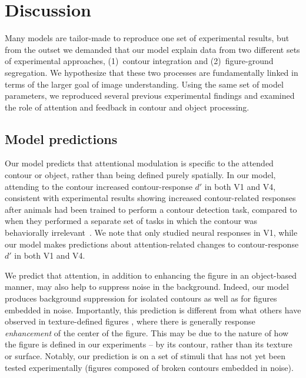 {\section{Discussion}
\label{sec:discussion}
%
Many models are tailor-made to reproduce one set of experimental results,
but from the outset we demanded
that our model explain data from two
different sets of experimental approaches, (1)~contour integration and
(2)~figure-ground segregation. 
We hypothesize that these two processes are 
 fundamentally linked in terms of the larger goal of image understanding.
Using the same set of model parameters, we reproduced several previous
experimental findings and examined the role of attention and feedback
in contour and object processing. 

\subsection{Model predictions}
Our model predicts that attentional modulation is specific to the
attended contour or object, 
rather than being defined purely
spatially. In our model, attending to the contour increased
contour-response $d'$ in both V1 and V4, consistent with experimental
results showing increased contour-related responses after animals had
been trained to perform a contour detection task, compared to when
they performed a separate set of tasks in which the contour was
behaviorally irrelevant~\citep{Li_etal08a}.  We note that
\cite{Li_etal08a} only studied neural responses in V1, while our model
makes predictions about attention-related changes to contour-response
$d'$ in both V1 and V4.

We predict that attention, in addition to enhancing the figure in an
object-based manner, may also help to suppress noise in the
background. Indeed, our model produces background suppression for
isolated contours as well as for figures embedded in noise.
Importantly, this prediction is different from what others have
observed in texture-defined figures \citep{Lamme95,Lee_etal98a}, where
there is generally response {\em enhancement} of the center of the
figure. This may be due to the nature of how the figure is defined in
our experiments -- by its contour, rather than its texture or surface.
Notably, our prediction is on a set of stimuli that has not yet been
tested experimentally (figures composed of broken contours embedded in noise).

}
